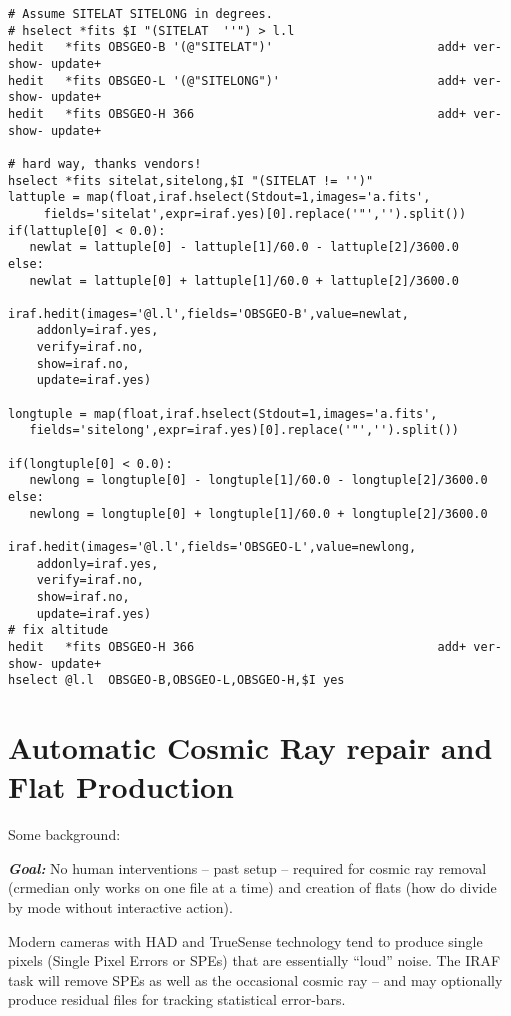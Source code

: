 \documentclass[letter,11pt,oneside]{article}
\begin{document}
\begin{landscape}
\begin{verbatim}
# Assume SITELAT SITELONG in degrees.
# hselect *fits $I "(SITELAT  ''") > l.l
hedit   *fits OBSGEO-B '(@"SITELAT")'                       add+ ver- show- update+
hedit   *fits OBSGEO-L '(@"SITELONG")'                      add+ ver- show- update+
hedit   *fits OBSGEO-H 366                                  add+ ver- show- update+

# hard way, thanks vendors!
hselect *fits sitelat,sitelong,$I "(SITELAT != '')" 
lattuple = map(float,iraf.hselect(Stdout=1,images='a.fits',
     fields='sitelat',expr=iraf.yes)[0].replace('"','').split())
if(lattuple[0] < 0.0):
   newlat = lattuple[0] - lattuple[1]/60.0 - lattuple[2]/3600.0
else:
   newlat = lattuple[0] + lattuple[1]/60.0 + lattuple[2]/3600.0

iraf.hedit(images='@l.l',fields='OBSGEO-B',value=newlat,
    addonly=iraf.yes,
    verify=iraf.no,
    show=iraf.no,
    update=iraf.yes)

longtuple = map(float,iraf.hselect(Stdout=1,images='a.fits',
   fields='sitelong',expr=iraf.yes)[0].replace('"','').split())

if(longtuple[0] < 0.0):
   newlong = longtuple[0] - longtuple[1]/60.0 - longtuple[2]/3600.0
else:
   newlong = longtuple[0] + longtuple[1]/60.0 + longtuple[2]/3600.0

iraf.hedit(images='@l.l',fields='OBSGEO-L',value=newlong,
    addonly=iraf.yes,
    verify=iraf.no,
    show=iraf.no,
    update=iraf.yes)
# fix altitude
hedit   *fits OBSGEO-H 366                                  add+ ver- show- update+
hselect @l.l  OBSGEO-B,OBSGEO-L,OBSGEO-H,$I yes
\end{verbatim}
\endgroup
\end{landscape}


\appendix
\renewcommand \thesection{\Alph{section}}

\section*{Automatic Cosmic Ray repair and Flat Production}

Some background:

\textbf{\emph{Goal:}} No human interventions -- past setup -- required
for cosmic ray removal (crmedian only works on one file at a time) and
creation of flats (how do divide by mode without interactive action).

Modern cameras with HAD\texttrademark\; and TrueSense \texttrademark\;
technology tend to produce single pixels (Single Pixel Errors or SPEs)
that are essentially ``loud'' noise. The IRAF task
{\color{verbcolor}{\verb#noao.crutil.crmedian#}} will remove SPEs as
well as the occasional cosmic ray -- and may optionally produce
residual files for tracking statistical error-bars.
\end{document}
